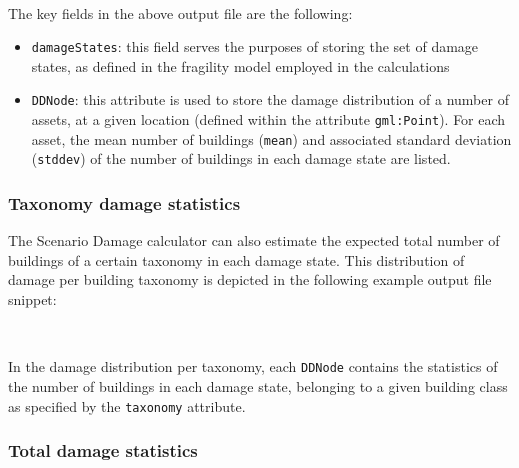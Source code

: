 \inputminted[firstline=1,firstnumber=1,fontsize=\footnotesize,frame=single,linenos,bgcolor=lightgray]{xml}{oqum/risk/verbatim/output_scenario_damage_asset.xml}\\

The key fields in the above output file are the following:

\begin{itemize}

  \item \Verb+damageStates+: this field serves the purposes of storing the set
    of damage states, as defined in the \gls{fragility model} employed in the
    calculations

  \item \Verb+DDNode+: this attribute is used to store the damage distribution
    of a number of \glspl{asset}, at a given location (defined within the
    attribute \Verb+gml:Point+). For each \gls{asset}, the mean number of
    buildings (\Verb+mean+) and associated standard deviation (\Verb+stddev+)
    of the number of buildings in each damage state are listed.

\end{itemize}


\subsubsection{Taxonomy damage statistics}
\label{subsubsec:scenario_taxonomy_damage_statistics}

The Scenario Damage calculator can also estimate the expected total number of
buildings of a certain \gls{taxonomy} in each damage state. This distribution
of damage per building \gls{taxonomy} is depicted in the following example
output file snippet:

\inputminted[firstline=1,firstnumber=1,fontsize=\footnotesize,frame=single,linenos,bgcolor=lightgray]{xml}{oqum/risk/verbatim/output_scenario_damage_taxonomy.xml}\\

In the damage distribution per \gls{taxonomy}, each \Verb+DDNode+ contains the
statistics of the number of buildings in each damage state, belonging to a
given building class as specified by the \Verb+taxonomy+ attribute.


\subsubsection{Total damage statistics}
\label{subsubsec:scenario_total_damage_statistics}

